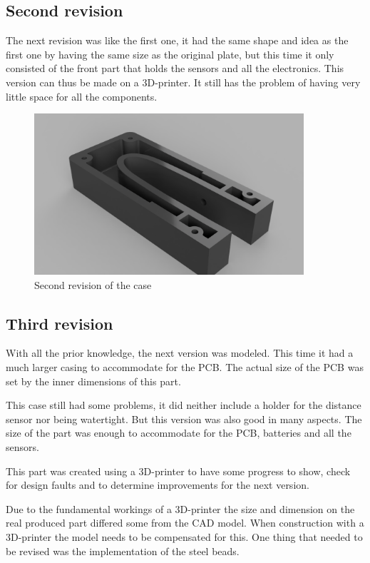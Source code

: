\subsection{Second revision}
The next revision was like the first one, it had the same shape and idea as the first one by having the same size as the original plate, but this time it only consisted of the front part that holds the sensors and all the electronics. This version can thus be made on a 3D-printer. It still has the problem of having very little space for all the components.    

\begin{figure}[H]
\begin{center}
	\includegraphics[width = 10cm]{Figures/Case_rev_2.png}
	\caption{Second revision of the case}
	\label{Case_rev_2}
\end{center}
\end{figure}

\subsection{Third revision}
With all the prior knowledge, the next version was modeled. This time it had a much larger casing to accommodate for the PCB. The actual size of the PCB was set by the inner dimensions of this part.  

This case still had some problems, it did neither include a holder for the distance sensor nor being watertight. But this version was also good in many aspects. The size of the part was enough to accommodate for the PCB, batteries and all the sensors.  

This part was created using a 3D-printer to have some progress to show, check for design faults and to determine improvements for the next version.  

Due to the fundamental workings of a 3D-printer the size and dimension on the real produced part differed some from the CAD model. When construction with a 3D-printer the model needs to be compensated for this. One thing that needed to be revised was the implementation of the steel beads.  

